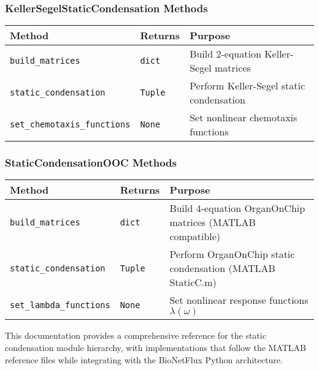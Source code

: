 \subsubsection{KellerSegelStaticCondensation Methods}

\begin{longtable}{|p{4.7cm}|p{2cm}|p{7cm}|}
\hline
\textbf{Method} & \textbf{Returns} & \textbf{Purpose} \\
\hline
\endhead

\texttt{build\_matrices} & \texttt{dict} & Build 2-equation Keller-Segel matrices \\
\hline

\texttt{static\_condensation} & \texttt{Tuple} & Perform Keller-Segel static condensation \\
\hline

\texttt{set\_chemotaxis\_functions} & \texttt{None} & Set nonlinear chemotaxis functions \\
\hline

\end{longtable}

\subsubsection{StaticCondensationOOC Methods}

\begin{longtable}{|p{4cm}|p{2cm}|p{7cm}|}
\hline
\textbf{Method} & \textbf{Returns} & \textbf{Purpose} \\
\hline
\endhead

\texttt{build\_matrices} & \texttt{dict} & Build 4-equation OrganOnChip matrices (MATLAB compatible) \\
\hline

\texttt{static\_condensation} & \texttt{Tuple} & Perform OrganOnChip static condensation (MATLAB StaticC.m) \\
\hline

\texttt{set\_lambda\_functions} & \texttt{None} & Set nonlinear response functions $\lambda(\omega)$ \\
\hline

\end{longtable}

This documentation provides a comprehensive reference for the static condensation module hierarchy, with implementations that follow the MATLAB reference files while integrating with the BioNetFlux Python architecture.

